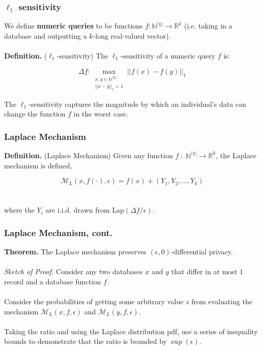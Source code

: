 \documentclass[aspectratio=169]{beamer}
\newcommand{\emm}{\mathcal{M}}
\newcommand{\dbd}{\mathbb{N}^{|\chi|}}
\begin{document}
\begin{frame}
\frametitle{$\ell_1$ sensitivity}

We define \textbf{numeric queries} to be functions $f: \dbd \rightarrow \mathbb{R}^k$ (i.e. taking in a database and outputting a $k$-long real-valued vector).\\~\\

\textbf{Definition.} ($\ell_1$-sensitivity) The $\ell_1$-sensitivity of a numeric query $f$ is: 

$$\Delta f: \max_{\substack{x,y \in \dbd\\ ||x-y||_1 = 1}} ||f(x) - f(y)||_1$$

The $\ell_1$-sensitivity captures the magnitude by which an individual's data can change the function $f$ in the worst case.
\end{frame}

\begin{frame}
\frametitle{Laplace Mechanism}

\textbf{Definition.} (Laplace Mechanism) Given any function $f\;:\; \dbd \rightarrow \mathbb{R}^k$, the Laplace mechanism is defined,

$$\emm_L(x, f(\cdot), \epsilon) = f(x) + (Y_1, Y_2, \dots, Y_k)$$\\~\\

where the $Y_i$ are i.i.d. drawn from $\text{Lap}(\Delta f/\epsilon)$.
\end{frame}

\begin{frame}
\frametitle{Laplace Mechanism, cont.}

\textbf{Theorem.} The Laplace mechanism preserves $(\epsilon, 0)$-differential privacy.\\~\\

\emph{Sketch of Proof.} Consider any two databases $x$ and $y$ that differ in at most $1$ record and a database function $f$. \\~\\

Consider the probabilities of getting some arbitrary value $z$ from evaluating the mechanism $\emm_L(x, f, \epsilon)$ and $\emm_L(y, f, \epsilon)$.\\~\\

Taking the ratio and using the Laplace distribution pdf, use a series of inequality bounds to demonstrate that the ratio is bounded by $\exp(\epsilon)$.

\end{frame}
\end{document}
